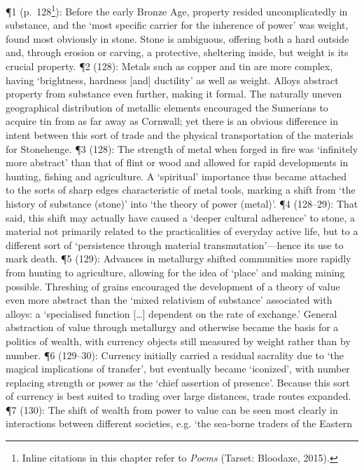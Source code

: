 \documentclass[]{article}
\begin{document}
¶1 (p.~128\footnote{Inline citations in this chapter refer to
  \emph{Poems} (Tarset: Bloodaxe, 2015).}): Before the early Bronze Age,
property resided uncomplicatedly in substance, and the ‘most specific
carrier for the inherence of power’ was weight, found most obviously in
stone. Stone is ambiguous, offering both a hard outside and, through
erosion or carving, a protective, sheltering inside, but weight is its
crucial property. ¶2 (128): Metals such as copper and tin are more
complex, having ‘brightness, hardness {[}and{]} ductility’ as well as
weight. Alloys abstract property from substance even further, making it
formal. The naturally uneven geographical distribution of metallic
elements encouraged the Sumerians to acquire tin from as far away as
Cornwall; yet there is an obvious difference in intent between this sort
of trade and the physical transportation of the materials for
Stonehenge. ¶3 (128): The strength of metal when forged in fire was
‘infinitely more abstract’ than that of flint or wood and allowed for
rapid developments in hunting, fishing and agriculture. A ‘spiritual’
importance thus became attached to the sorts of sharp edges
characteristic of metal tools, marking a shift from ‘the history of
substance (stone)’ into ‘the theory of power (metal)’. ¶4 (128–29): That
said, this shift may actually have caused a ‘deeper cultural adherence’
to stone, a material not primarily related to the practicalities of
everyday active life, but to a different sort of ‘persistence through
material transmutation’—hence its use to mark death. ¶5 (129): Advances
in metallurgy shifted communities more rapidly from hunting to
agriculture, allowing for the idea of ‘place’ and making mining
possible. Threshing of grains encouraged the development of a theory of
value even more abstract than the ‘mixed relativism of substance’
associated with alloys: a ‘specialised function {[}\ldots{}{]} dependent
on the rate of exchange.’ General abstraction of value through
metallurgy and otherwise became the basis for a politics of wealth, with
currency objects still measured by weight rather than by number. ¶6
(129–30): Currency initially carried a residual sacrality due to ‘the
magical implications of transfer’, but eventually became ‘iconized’,
with number replacing strength or power as the ‘chief assertion of
presence’. Because this sort of currency is best suited to trading over
large distances, trade routes expanded. ¶7 (130): The shift of wealth
from power to value can be seen most clearly in interactions between
different societies, e.g. ‘the sea-borne traders of the Eastern
\end{document}
